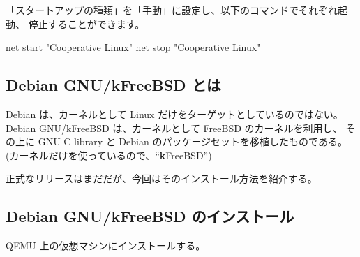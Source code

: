 \documentclass[mingoth,a4paper]{jsarticle}
\begin{document}
「スタートアップの種類」を「手動」に設定し、以下のコマンドでそれぞれ起動、
停止することができます。
\begin{commandline}
net start "Cooperative Linux"
net stop "Cooperative Linux"
\end{commandline}


\subsection{Debian GNU/kFreeBSD とは}

Debian は、カーネルとして Linux だけをターゲットとしているのではない。
Debian GNU/kFreeBSD は、カーネルとして FreeBSD のカーネルを利用し、
その上に GNU C library と Debian のパッケージセットを移植したものである。
(カーネルだけを使っているので、``\textbf{k}FreeBSD'')

正式なリリースはまだだが、今回はそのインストール方法を紹介する。

\subsection{Debian GNU/kFreeBSD のインストール}

QEMU 上の仮想マシンにインストールする。
\end{document}

